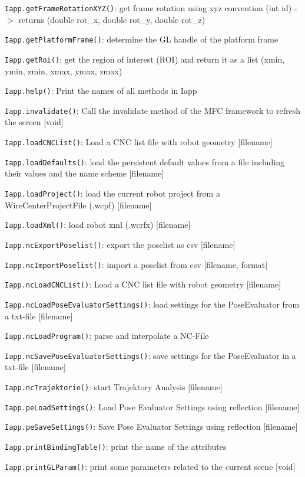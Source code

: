 \documentclass[11pt,a4paper,onepage,openany]{book}
\begin{document}
\texttt{Iapp.getFrameRotationXYZ()}: get frame rotation using xyz convention
(int id) -$>$ returns (double rot\_x, double rot\_y, double rot\_z)

\texttt{Iapp.getPlatformFrame()}: determine the GL handle of the platform frame

\texttt{Iapp.getRoi()}: get the region of interest (ROI) and return it as a
list (xmin, ymin, zmin, xmax, ymax, zmax)

\texttt{Iapp.help()}: Print the names of all methods in Iapp

\texttt{Iapp.invalidate()}: Call the invalidate method of the MFC framework to
refresh the screen [void]

\texttt{Iapp.loadCNCList()}: Load a CNC list file with robot geometry
[filename]

\texttt{Iapp.loadDefaults()}: load the persistent default values from a file
including their values and the name scheme [filename]

\texttt{Iapp.loadProject()}: load the current robot project from a
WireCenterProjectFile (.wcpf) [filename]

\texttt{Iapp.loadXml()}: load robot xml (.wcrfx) [filename]

\texttt{Iapp.ncExportPoselist()}: export the poselist as csv [filename]

\texttt{Iapp.ncImportPoselist()}: import a poselist from csv [filename, format]

\texttt{Iapp.ncLoadCNCList()}: Load a CNC list file with robot geometry
[filename]

\texttt{Iapp.ncLoadPoseEvaluatorSettings()}: load settings for the
PoseEvaluator from a txt-file [filename]

\texttt{Iapp.ncLoadProgram()}: parse and interpolate a NC-File

\texttt{Iapp.ncSavePoseEvaluatorSettings()}: save settings for the
PoseEvaluator in a txt-file [filename]

\texttt{Iapp.ncTrajektorie()}: start Trajektory Analysis [filename]

\texttt{Iapp.peLoadSettings()}: Load Pose Evaluator Settings using reflection
[filename]

\texttt{Iapp.peSaveSettings()}: Save Pose Evaluator Settings using reflection
[filename]

\texttt{Iapp.printBindingTable()}: print the name of the attributes

\texttt{Iapp.printGLParam()}: print some parameters related to the current
scene [void]
\end{document}
